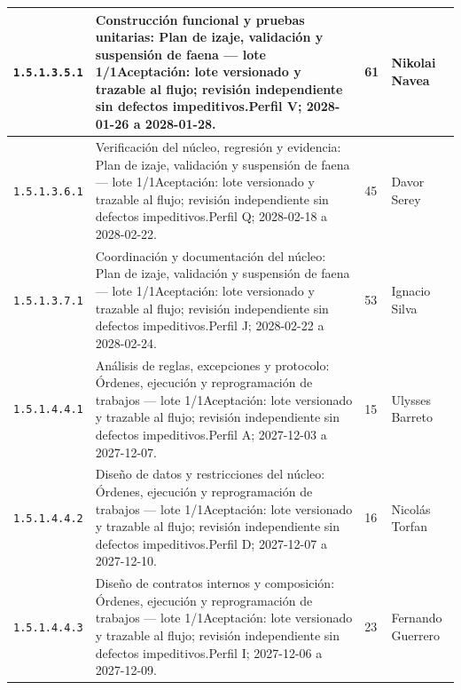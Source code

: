 \begin{longtable}{L{29mm}L{80mm}R{12mm}L{28mm}}
\texttt{1.\allowbreak{}5.\allowbreak{}1.\allowbreak{}3.\allowbreak{}5.\allowbreak{}1} & Construcción funcional y pruebas unitarias: Plan de izaje, validación y suspensión de faena — lote 1/1\newline Aceptación: lote versionado y trazable al flujo; revisión independiente sin defectos impeditivos.\newline Perfil V; 2028-01-26 a 2028-01-28. & 61 & Nikolai Navea\\\hline
\texttt{1.\allowbreak{}5.\allowbreak{}1.\allowbreak{}3.\allowbreak{}6.\allowbreak{}1} & Verificación del núcleo, regresión y evidencia: Plan de izaje, validación y suspensión de faena — lote 1/1\newline Aceptación: lote versionado y trazable al flujo; revisión independiente sin defectos impeditivos.\newline Perfil Q; 2028-02-18 a 2028-02-22. & 45 & Davor Serey\\\hline
\texttt{1.\allowbreak{}5.\allowbreak{}1.\allowbreak{}3.\allowbreak{}7.\allowbreak{}1} & Coordinación y documentación del núcleo: Plan de izaje, validación y suspensión de faena — lote 1/1\newline Aceptación: lote versionado y trazable al flujo; revisión independiente sin defectos impeditivos.\newline Perfil J; 2028-02-22 a 2028-02-24. & 53 & Ignacio Silva\\\hline
\texttt{1.\allowbreak{}5.\allowbreak{}1.\allowbreak{}4.\allowbreak{}4.\allowbreak{}1} & Análisis de reglas, excepciones y protocolo: Órdenes, ejecución y reprogramación de trabajos — lote 1/1\newline Aceptación: lote versionado y trazable al flujo; revisión independiente sin defectos impeditivos.\newline Perfil A; 2027-12-03 a 2027-12-07. & 15 & Ulysses Barreto\\\hline
\texttt{1.\allowbreak{}5.\allowbreak{}1.\allowbreak{}4.\allowbreak{}4.\allowbreak{}2} & Diseño de datos y restricciones del núcleo: Órdenes, ejecución y reprogramación de trabajos — lote 1/1\newline Aceptación: lote versionado y trazable al flujo; revisión independiente sin defectos impeditivos.\newline Perfil D; 2027-12-07 a 2027-12-10. & 16 & Nicolás Torfan\\\hline
\texttt{1.\allowbreak{}5.\allowbreak{}1.\allowbreak{}4.\allowbreak{}4.\allowbreak{}3} & Diseño de contratos internos y composición: Órdenes, ejecución y reprogramación de trabajos — lote 1/1\newline Aceptación: lote versionado y trazable al flujo; revisión independiente sin defectos impeditivos.\newline Perfil I; 2027-12-06 a 2027-12-09. & 23 & Fernando Guerrero\\\hline

\end{longtable}
